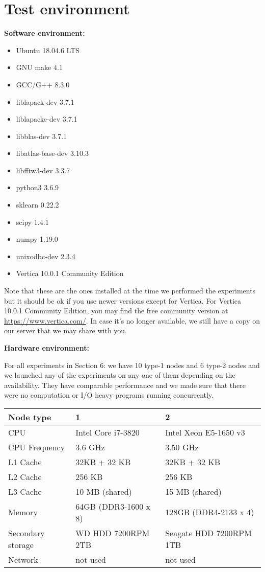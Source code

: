 \documentclass[11pt]{article}
\newenvironment{pkl}{%
\begin{itemize}%
\setlength\itemsep{-0.5\parskip}%
\setlength\parsep{0in}%
}{%
\end{itemize}}
\begin{document}
\section{Test environment}
{\bf Software environment:}
\begin{pkl}
	\item Ubuntu 18.04.6 LTS
    \item GNU make 4.1
	\item GCC/G++ 8.3.0
	\item liblapack-dev 3.7.1
	\item liblapacke-dev 3.7.1
	\item libblas-dev 3.7.1
	\item libatlas-base-dev 3.10.3
	\item libfftw3-dev 3.3.7
    \item python3 3.6.9
    \item sklearn 0.22.2
    \item scipy 1.4.1
    \item numpy 1.19.0
    \item unixodbc-dev 2.3.4
    \item Vertica 10.0.1 Community Edition
\end{pkl}
Note that these are the ones installed at the time we performed the
experiments but it should be ok if you use newer versions except for
Vertica. For Vertica 10.0.1 Community Edition, you may find the free
community version at \url{https://www.vertica.com/}. In case it's no
longer available, we still have a copy on our server that we may share
with you.

{\bf Hardware environment:}

For all experiments in Section 6: we have 10 type-1 nodes and 6 type-2
nodes and we launched any of the experiments on any one of them
depending on the availability. They have comparable performance and we
made sure that there were no computation or I/O heavy programs running
concurrently.

\vspace{1mm}
\begin{tabular}{|l|l|l|}
	\hline
	Node type &  1 & 2 \\\hline
	CPU & Intel Core i7-3820 & Intel Xeon E5-1650 v3 \\\hline
	CPU Frequency & 3.6 GHz & 3.50 GHz \\\hline
	L1 Cache & 32KB + 32 KB & 32KB + 32 KB\\\hline
	L2 Cache & 256 KB & 256 KB\\\hline
	L3 Cache & 10 MB (shared) & 15 MB (shared) \\\hline
	Memory & 64GB (DDR3-1600 x 8) & 128GB (DDR4-2133 x 4) \\\hline
	Secondary storage & WD HDD 7200RPM 2TB & Seagate HDD 7200RPM 1TB
	\\\hline
	Network & not used & not used \\\hline
\end{tabular}
\vspace{1mm}
\end{document}
